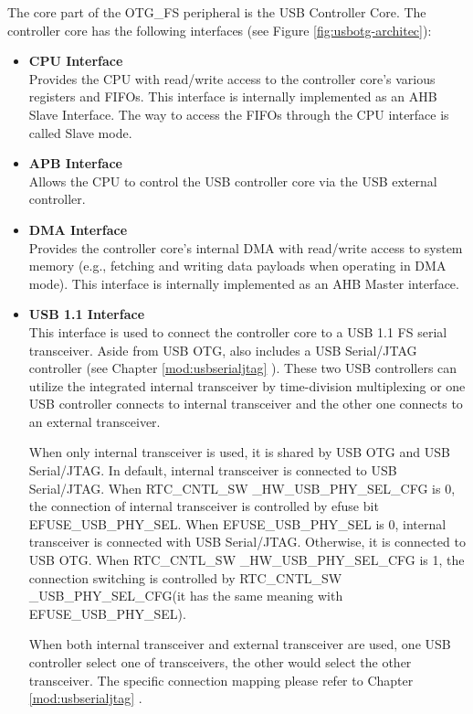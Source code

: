 \documentclass[main\_\_EN.tex]{subfiles}
\begin{document}
The core part of the OTG\_FS peripheral is the USB Controller Core. The controller core has the following interfaces (see Figure \ref{fig:usbotg-architec}):

\begin{itemize}
    \item {\bfseries CPU Interface}\\
    Provides the CPU with read/write access to the controller core's various registers and FIFOs. This interface is internally implemented as an AHB Slave Interface. The way to access the FIFOs through the CPU interface is called Slave mode.

    \item {\bfseries APB Interface}\\
    Allows the CPU to control the USB controller core via the USB external controller.

    \item {\bfseries DMA Interface}\\
    Provides the controller core's internal DMA with read/write access to system memory (e.g., fetching and writing data payloads when operating in DMA mode). This interface is internally implemented as an AHB Master interface.

    \item {\bfseries USB 1.1 Interface}\\
    This interface is used to connect the controller core to a USB 1.1 FS serial transceiver. Aside from USB OTG, \chipname{} also includes a USB Serial/JTAG controller (see Chapter \ref{mod:usbserialjtag} \textit{}). These two USB controllers can utilize the integrated internal transceiver by time-division multiplexing or one USB controller connects to internal transceiver and the other one connects to an external transceiver.

    When only internal transceiver is used, it is shared by USB OTG and USB Serial/JTAG. In default, internal transceiver is connected to USB Serial/JTAG. When RTC\_CNTL\_SW
    \_HW\_USB\_PHY\_SEL\_CFG is 0, the connection of internal transceiver is controlled by efuse bit EFUSE\_USB\_PHY\_SEL. When EFUSE\_USB\_PHY\_SEL is 0, internal transceiver is connected with USB Serial/JTAG. Otherwise, it is connected to USB OTG. When RTC\_CNTL\_SW
    \_HW\_USB\_PHY\_SEL\_CFG is 1, the connection switching is controlled by RTC\_CNTL\_SW
    \_USB\_PHY\_SEL\_CFG(it has the same meaning with EFUSE\_USB\_PHY\_SEL).

    When both internal transceiver and external transceiver are used, one USB controller select one of transceivers, the other would select the other transceiver. The specific connection mapping please refer to Chapter \ref{mod:usbserialjtag} \textit{}.


\end{itemize}
\end{document}
